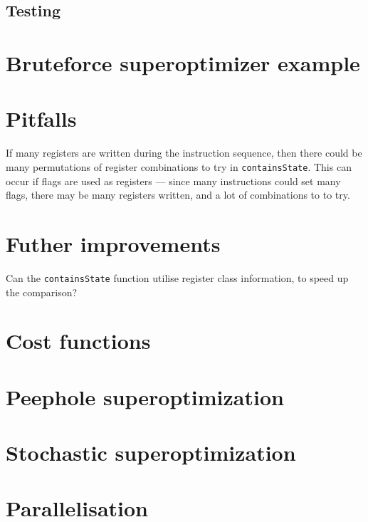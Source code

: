 \documentclass{article}
\begin{document}

\subsection{Testing}

\section{Bruteforce superoptimizer example}


\section{Pitfalls}

If many registers are written during the instruction sequence, then there could be many permutations of register combinations to try in \texttt{containsState}. This can occur if flags are used as registers --- since many instructions could set many flags, there may be many registers written, and a lot of combinations to to try.


\section{Futher improvements}

Can the \texttt{containsState} function utilise register class information, to speed up the comparison?

\appendix
\section{Cost functions}

\section{Peephole superoptimization}


\section{Stochastic superoptimization}
\section{Parallelisation}
\end{document}
